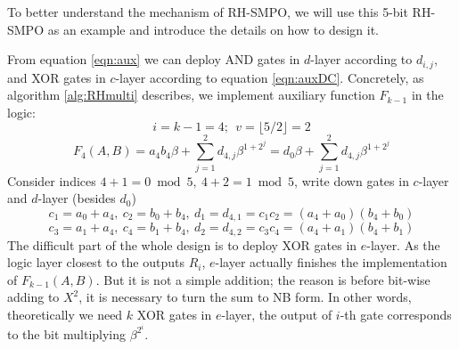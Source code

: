 To better understand the mechanism of RH-SMPO, we will use this 5-bit 
RH-SMPO as an example and introduce the details on how to design it.
\begin{Example}
From equation \ref{eqn:aux} we can deploy AND gates in $d$-layer according to $d_{i,j}$,
and XOR gates in $c$-layer according to equation \ref{eqn:auxDC}. Concretely, as algorithm \ref{alg:RHmulti}
describes, we implement auxiliary function $F_{k-1}$ in the logic:
$$i = k-1 = 4;~~v=\lfloor 5/2 \rfloor = 2$$
\begin{equation}
\label{eqn:5bitRHaux}
F_{4}(A,B) = a_4b_4\beta+\sum_{j=1}^2 d_{4,j}\beta^{1+2^j} = d_0\beta+\sum_{j=1}^2 d_{4,j}\beta^{1+2^j}
\end{equation}
Consider indices $4+1=0\bmod 5,~4+2=1\bmod 5$, write down gates in $c$-layer and $d$-layer (besides $d_0$)
$$c_1 = a_0+a_4,~c_2 = b_0+b_4,~d_1=d_{4,1}= c_1c_2 = (a_4+a_0)(b_4+b_0)$$
$$c_3 = a_1+a_4,~c_4 = b_1+b_4,~d_2=d_{4,2}= c_3c_4 = (a_4+a_1)(b_4+b_1)$$
The difficult part of the whole design is to deploy XOR gates in $e$-layer. 
As the logic layer closest to the outputs $R_i$, $e$-layer actually finishes the implementation of 
$F_{k-1}(A,B)$. But it is not a simple addition; the reason is before bit-wise adding to $X^2$, it is necessary to 
turn the sum to NB form. In other words, theoretically we need $k$ XOR gates in $e$-layer, the output of 
$i$-th gate corresponds to the bit multiplying $\beta^{2^i}$.


\end{Example}
